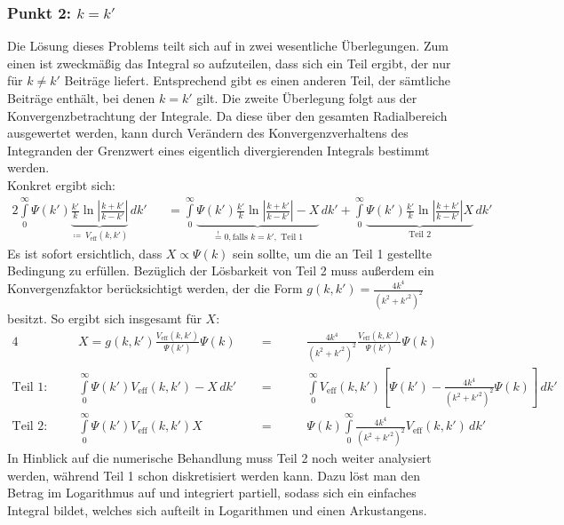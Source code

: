 \subsubsection{Punkt 2: $k = k'$}
Die Lösung dieses Problems teilt sich auf in zwei wesentliche Überlegungen. Zum einen ist zweckmäßig das Integral so aufzuteilen, dass sich ein Teil ergibt, der nur für $k\neq k'$ Beiträge liefert. Entsprechend gibt es einen anderen Teil, der sämtliche Beiträge enthält, bei denen $k=k'$ gilt. Die zweite Überlegung folgt aus der Konvergenzbetrachtung der Integrale. Da diese über den gesamten Radialbereich ausgewertet werden, kann durch Verändern des Konvergenzverhaltens des Integranden der Grenzwert eines eigentlich divergierenden Integrals bestimmt werden. \\
Konkret ergibt sich: 
\begin{alignat*}{2}
\int\limits_{0}^{\infty} \Psi(k ')\underbrace{\frac{k '}{k}\ln{\left |\frac{k + k '}{k-k'}\right |}}_{\coloneqq \, V_\text{eff}(k,k')}\, dk' && = \int\limits_{0}^{\infty} \underbrace{\Psi(k ')\frac{k '}{k}\ln{\left |\frac{k + k '}{k-k'}\right |}-X}_{\stackrel{!}{=}0,\text{falls }k=k',\text{ Teil 1}}\, dk' + 
		 	\int\limits_{0}^{\infty} \underbrace{\Psi(k ')\frac{k '}{k}\ln{\left |\frac{k + k '}{k-k'}\right |}X}_{\text{Teil 2}}\, dk' 
\end{alignat*}
Es ist sofort ersichtlich, dass $X \propto \Psi(k)$ sein sollte, um die an Teil 1 gestellte Bedingung zu erfüllen. Bezüglich der Lösbarkeit von Teil 2 muss außerdem ein Konvergenzfaktor berücksichtigt werden, der die Form $g(k,k') = \frac{4k^4}{(k^2 + k'^2)^2}$ besitzt. So ergibt sich insgesamt für $X$: 
\begin{alignat*}{4}
&& X = g(k,k')\frac{V_\text{eff}(k,k')}{\Psi(k')}\Psi(k)  &&\ \ =\ \ && &\frac{4k^4}{(k^2+k '^2) ^2}\frac{V_\text{eff}(k,k')}{\Psi(k')}\Psi(k) \\
\text{Teil 1:}\qquad 	&&  \int\limits_{0}^{\infty} \Psi(k ')V_\text{eff}(k,k')-X \,dk' && \ \ = \ \ &&
											&\int\limits_{0}^{\infty} V_\text{eff}(k,k')\left [\Psi(k ')-\frac{4k^4}{(k^2+k '^2)^2}\Psi(k)\right ]\,dk'  \\ 
\text{Teil 2:}\qquad 	&& 	\int\limits_{0}^{\infty} \Psi(k ')V_\text{eff}(k,k')X   && \ \ = \ \ &&
											&\Psi(k)\int\limits_{0}^{\infty} \frac{4k^4}{(k^2+k '^2)^2}V_\text{eff}(k,k')\,dk'
\end{alignat*}
In Hinblick auf die numerische Behandlung muss Teil 2 noch weiter analysiert werden, während Teil 1 schon diskretisiert werden kann. Dazu löst man den Betrag im Logarithmus auf und integriert partiell, sodass sich ein einfaches Integral bildet, welches sich aufteilt in Logarithmen und einen Arkustangens.
